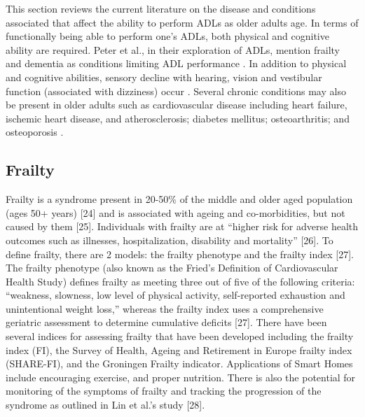 This section reviews the current literature on the disease and conditions associated that affect the ability to perform ADLs as older adults age. In terms of functionally being able to perform one's ADLs, both physical and cognitive ability are required. Peter et al., in their exploration of ADLs, mention frailty and dementia as conditions limiting ADL performance \cite{edemekong_activities_2023}. In addition to physical and cognitive abilities, sensory decline with hearing, vision and vestibular function (associated with dizziness) occur \cite{jaul_age-related_2017}. Several chronic conditions may also be present in older adults such as cardiovascular disease including heart failure, ischemic heart disease, and atherosclerosis; diabetes mellitus; osteoarthritis; and osteoporosis \cite{jaul_age-related_2017}.

\subsection{Frailty}
Frailty is a syndrome present in 20-50\% of the middle and older aged population (ages 50+ years) [24] and is associated with ageing and co-morbidities, but not caused by them [25]. Individuals with frailty are at “higher risk for adverse health outcomes such as illnesses, hospitalization, disability and mortality” [26]. To define frailty, there are 2 models: the frailty phenotype and the frailty index [27]. The frailty phenotype (also known as the Fried’s Definition of Cardiovascular Health Study) defines frailty as meeting three out of five of the following criteria: “weakness, slowness, low level of physical activity, self-reported exhaustion and unintentional weight loss,” whereas the frailty index uses a comprehensive geriatric assessment to determine cumulative deficits [27]. There have been several indices for assessing frailty that have been developed including the frailty index (FI), the Survey of Health, Ageing and Retirement in Europe frailty index (SHARE-FI), and the Groningen Frailty indicator. Applications of Smart Homes include encouraging exercise, and proper nutrition. There is also the potential for monitoring of the symptoms of frailty and tracking the progression of the syndrome as outlined in Lin et al.’s study [28].

